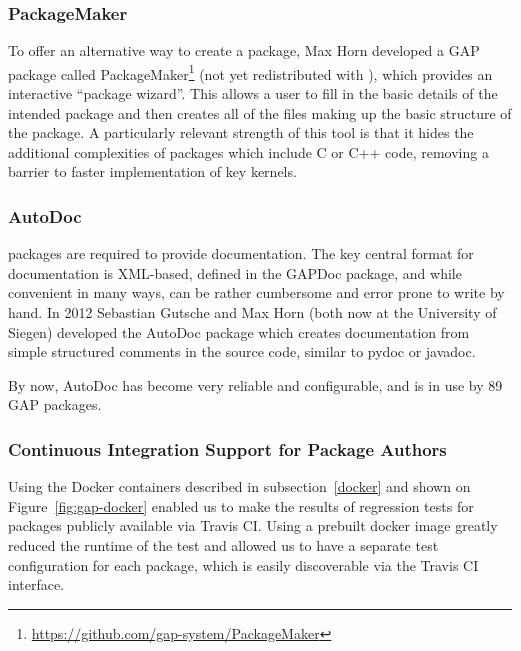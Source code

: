 \subsubsection{PackageMaker}
To offer an alternative way to create a package,
Max Horn developed a GAP package called
{\sf PackageMaker}\footnote{\url{https://github.com/gap-system/PackageMaker}}
(not yet redistributed with \GAP),
which provides an interactive  ``package wizard''. This allows a
user to fill in the basic details 
of the intended package and then creates all of the files making up
the basic structure of the package. A particularly relevant
strength of this tool is that it hides the additional complexities of
packages which include C or C++ code, removing a barrier to faster implementation
of key kernels.

\subsubsection{AutoDoc}
\GAP packages are required to provide documentation.  The key central
format for \GAP documentation is XML-based, defined in the {\sf
  GAPDoc} package, and while convenient in many ways, can be rather
cumbersome and error prone to write by hand.
In 2012 Sebastian Gutsche 
and Max Horn (both now at the University of Siegen) developed the 
{\sf AutoDoc} package \cite{autodoc} which creates
documentation from simple structured comments in the source code,
similar to pydoc or javadoc.

By now, {\sf AutoDoc} has become very reliable and configurable, and
is in use by 89 GAP packages.
%
%

\subsubsection{Continuous Integration Support for Package Authors}
Using the Docker containers described in subsection~\ref{docker}
and shown on Figure~\ref{fig:gap-docker} enabled us to make the
results of regression tests for \GAP packages publicly
available via Travis CI. Using a prebuilt docker image 
greatly reduced the runtime of the test and allowed us to
have a separate test configuration for each package,
which is easily discoverable via the Travis CI interface.

